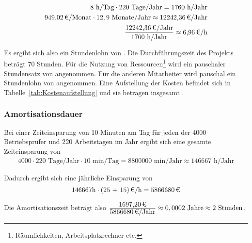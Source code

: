 \begin{eqnarray}
8 \mbox{ h/Tag} \cdot 220 \mbox{ Tage/Jahr} = 1760 \mbox{ h/Jahr}\\
\eur{949.02}\mbox{/Monat} \cdot 12,9 \mbox{ Monate/Jahr} \approx \eur{12242,36} \mbox{/Jahr}\\
\frac{\eur{12242,36} \mbox{/Jahr}}{1760 \mbox{ h/Jahr}} \approx \eur{6,96}\mbox{/h}
\end{eqnarray}

Es ergibt sich also ein Stundenlohn von . 
Die Durchführungszeit des Projekts beträgt 70 Stunden. Für die Nutzung von Ressourcen\footnote{Räumlichkeiten, Arbeitsplatzrechner etc.} wird 
ein pauschaler Stundensatz von  angenommen. Für die anderen Mitarbeiter wird pauschal ein Stundenlohn von  angenommen. 
Eine Aufstellung der Kosten befindet sich in Tabelle~\ref{tab:Kostenaufstellung} und sie betragen insgesamt .


\subsubsection{Amortisationsdauer}
\label{sec:Amortisationsdauer}

Bei einer Zeiteinsparung von 10 Minuten am Tag für jeden der 4000 Betriebsprüfer und 220 Arbeitstagen im Jahr ergibt sich eine gesamte Zeiteinsparung von 
\begin{eqnarray}
4000 \cdot 220 \mbox{ Tage/Jahr} \cdot 10 \mbox{ min/Tag} = 8800000 \mbox{ min/Jahr} \approx 146667 \mbox{ h/Jahr} 
\end{eqnarray}

Dadurch ergibt sich eine jährliche Einsparung von 
\begin{eqnarray}
146667 \mbox{h} \cdot \eur{(25 + 15)}{\mbox{/h}} = \eur{5866680}
\end{eqnarray}

Die Amortisationszeit beträgt also $\frac{\eur{1697,20}}{\eur{5866680}\mbox{/Jahr}} \approx 0,0002 \mbox{ Jahre} \approx 2 \mbox{ Stunden}$.






